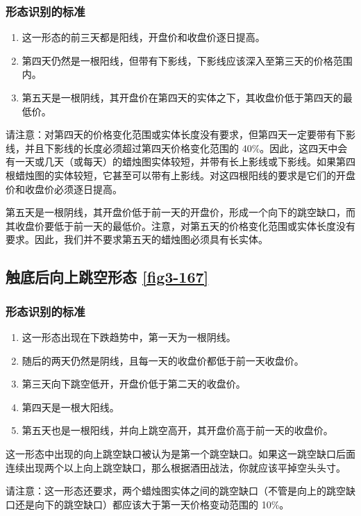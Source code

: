 \subsubsection*{形态识别的标准}
\begin{enumerate}
    \item 这一形态的前三天都是阳线，开盘价和收盘价逐日提高。
    \item 第四天仍然是一根阳线，但带有下影线，下影线应该深入至第三天的价格范围内。
    \item 第五天是一根阴线，其开盘价在第四天的实体之下，其收盘价低于第四天的最低价。
\end{enumerate}

请注意：对第四天的价格变化范围或实体长度没有要求，但第四天一定要带有下影线，并且下影线的长度必须超过第四天价格变化范围的 40\%。因此，这四天中会有一天或几天（或每天）的蜡烛图实体较短，并带有长上影线或下影线。如果第四根蜡烛图的实体较短，它甚至可以带有上影线。对这四根阳线的要求是它们的开盘价和收盘价必须逐日提高。

第五天是一根阴线，其开盘价低于前一天的开盘价，形成一个向下的跳空缺口，而其收盘价要低于前一天的最低价。注意，对第五天的价格变化范围或实体长度没有要求。因此，我们并不要求第五天的蜡烛图必须具有长实体。
\subsection{触底后向上跳空形态 \autoref{fig3-167}}
\subsubsection*{形态识别的标准}
\begin{enumerate}
    \item 这一形态出现在下跌趋势中，第一天为一根阴线。
    \item 随后的两天仍然是阴线，且每一天的收盘价都低于前一天收盘价。
    \item 第三天向下跳空低开，开盘价低于第二天的收盘价。
    \item 第四天是一根大阳线。
    \item 第五天也是一根阳线，并向上跳空高开，其开盘价高于前一天的收盘价。
\end{enumerate}

这一形态中出现的向上跳空缺口被认为是第一个跳空缺口。如果这一跳空缺口后面连续出现两个以上向上跳空缺口，那么根据酒田战法，你就应该平掉空头头寸。

\begin{tcolorbox}
    请注意：这一形态还要求，两个蜡烛图实体之间的跳空缺口（不管是向上的跳空缺口还是向下的跳空缺口）都应该大于第一天价格变动范围的 10\%。
\end{tcolorbox}
